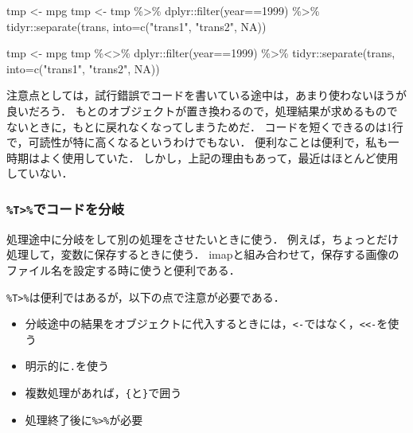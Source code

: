 \documentclass[
]{article}
\newenvironment{Shaded}{\begin{snugshade}}{\end{snugshade}}
\newcommand{\AttributeTok}[1]{\textcolor[rgb]{0.77,0.63,0.00}{#1}}
\newcommand{\ConstantTok}[1]{\textcolor[rgb]{0.00,0.00,0.00}{#1}}
\newcommand{\DecValTok}[1]{\textcolor[rgb]{0.00,0.00,0.81}{#1}}
\newcommand{\FunctionTok}[1]{\textcolor[rgb]{0.00,0.00,0.00}{#1}}
\newcommand{\NormalTok}[1]{#1}
\newcommand{\OtherTok}[1]{\textcolor[rgb]{0.56,0.35,0.01}{#1}}
\newcommand{\SpecialCharTok}[1]{\textcolor[rgb]{0.00,0.00,0.00}{#1}}
\newcommand{\StringTok}[1]{\textcolor[rgb]{0.31,0.60,0.02}{#1}}
\providecommand{\tightlist}{%
  \setlength{\itemsep}{0pt}\setlength{\parskip}{0pt}}
\begin{document}
\begin{Shaded}
\begin{Highlighting}[]
\NormalTok{tmp }\OtherTok{\textless{}{-}}\NormalTok{ mpg}
\NormalTok{tmp }\OtherTok{\textless{}{-}}
\NormalTok{  tmp }\SpecialCharTok{\%\textgreater{}\%}
\NormalTok{  dplyr}\SpecialCharTok{::}\FunctionTok{filter}\NormalTok{(year}\SpecialCharTok{==}\DecValTok{1999}\NormalTok{) }\SpecialCharTok{\%\textgreater{}\%}
\NormalTok{  tidyr}\SpecialCharTok{::}\FunctionTok{separate}\NormalTok{(trans, }\AttributeTok{into=}\FunctionTok{c}\NormalTok{(}\StringTok{"trans1"}\NormalTok{, }\StringTok{"trans2"}\NormalTok{, }\ConstantTok{NA}\NormalTok{))}

\NormalTok{tmp }\OtherTok{\textless{}{-}}\NormalTok{ mpg}
\NormalTok{tmp }\SpecialCharTok{\%\textless{}\textgreater{}\%}
\NormalTok{  dplyr}\SpecialCharTok{::}\FunctionTok{filter}\NormalTok{(year}\SpecialCharTok{==}\DecValTok{1999}\NormalTok{) }\SpecialCharTok{\%\textgreater{}\%}
\NormalTok{  tidyr}\SpecialCharTok{::}\FunctionTok{separate}\NormalTok{(trans, }\AttributeTok{into=}\FunctionTok{c}\NormalTok{(}\StringTok{"trans1"}\NormalTok{, }\StringTok{"trans2"}\NormalTok{, }\ConstantTok{NA}\NormalTok{))}
\end{Highlighting}
\end{Shaded}

注意点としては，試行錯誤でコードを書いている途中は，あまり使わないほうが良いだろう．
もとのオブジェクトが置き換わるので，処理結果が求めるものでないときに，もとに戻れなくなってしまうためだ．
コードを短くできるのは1行で，可読性が特に高くなるというわけでもない．
便利なことは便利で，私も一時期はよく使用していた．
しかし，上記の理由もあって，最近はほとんど使用していない．

\hypertarget{tux3067ux30b3ux30fcux30c9ux3092ux5206ux5c90}{%
\subsubsection{\texorpdfstring{\texttt{\%T\textgreater{}\%}でコードを分岐}{\%T\textgreater\%でコードを分岐}}\label{tux3067ux30b3ux30fcux30c9ux3092ux5206ux5c90}}

処理途中に分岐をして別の処理をさせたいときに使う．
例えば，ちょっとだけ処理して，変数に保存するときに使う．
imapと組み合わせて，保存する画像のファイル名を設定する時に使うと便利である．

\texttt{\%T\textgreater{}\%}は便利ではあるが，以下の点で注意が必要である．

\begin{itemize}
\tightlist
\item
  分岐途中の結果をオブジェクトに代入するときには，\texttt{\textless{}-}ではなく，\texttt{\textless{}\textless{}-}を使う\\
\item
  明示的に\texttt{.}を使う\\
\item
  複数処理があれば，\texttt{\{}と\texttt{\}}で囲う\\
\item
  処理終了後に\texttt{\%\textgreater{}\%}が必要
\end{itemize}
\end{document}
